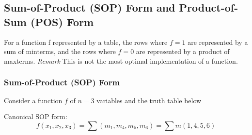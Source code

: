 \documentclass[12pt,openany]{book}
\begin{document}
			      	
			      	
			      	\newpage
			      	\subsection{Sum-of-Product (SOP) Form and Product-of-Sum (POS) Form}
			      	For a function f represented by a table, the rows where $f=1$ are represented by a sum of minterms, and the rows where $f=0$ are represented by a product of maxterms. \newline
			      	\textit{Remark} This is not the most optimal implementation of a function. \newline
			      	
			      	\subsubsection{Sum-of-Product (SOP) Form}
			      	\vspace*{10px}
			      	Consider a function \( f \) of \( n = 3 \) variables and the truth table below
			      	
			      	Canonical SOP form:
			      	\[
			      		f(x_1, x_2, x_3) = \sum (m_1, m_4, m_5, m_6) = \sum m(1, 4, 5, 6)
			      	\]
			      	
\end{document}
